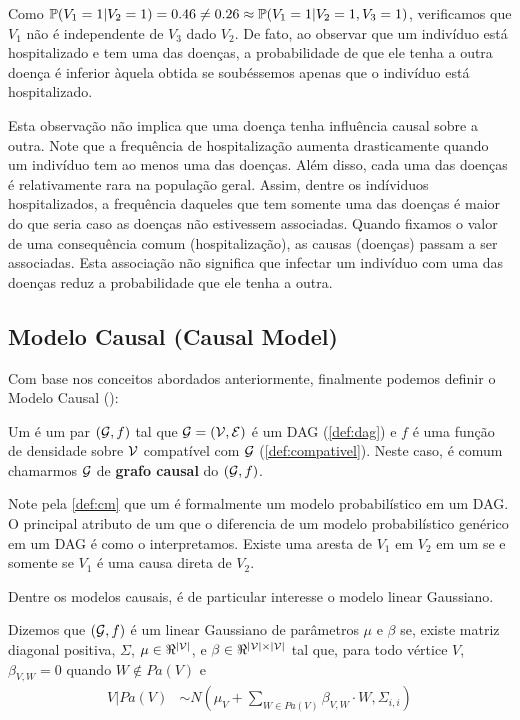 Como $\P(V_1=1|V_2=1) = 0.46 \neq 0.26 \approx \P(V_1=1|V_2=1,V_3=1)$,
verificamos que $V_1$ não é independente de $V_3$ dado $V_2$.
De fato, ao observar que um indivíduo está hospitalizado e
tem uma das doenças, a probabilidade de que ele tenha
a outra doença é inferior àquela obtida se soubéssemos apenas
que o indivíduo está hospitalizado.

Esta observação 
não implica que uma doença tenha influência causal sobre a outra.
Note que a frequência de hospitalização aumenta 
drasticamente quando um indivíduo tem ao menos uma das doenças.
Além disso, cada uma das doenças é relativamente rara na população geral.
Assim, dentre os indíviduos hospitalizados,
a frequência daqueles que tem somente uma das doenças é
maior do que seria caso as doenças não estivessem associadas.
Quando fixamos o valor de uma consequência comum (hospitalização),
as causas (doenças) passam a ser associadas.
Esta associação não significa que
infectar um indivíduo com uma das doenças
reduz a probabilidade que ele tenha a outra.

\subsection{Modelo Causal (Causal Model)}
\label{sec:cm}

Com base nos conceitos abordados anteriormente,
finalmente podemos definir
o Modelo Causal (\CM):

\begin{definition}
 \label{def:cm}
 Um \CM é um par $(\sG,f)$ tal que
 $\sG = (\sV, \sE)$ é um DAG (\cref{def:dag}) e
 $f$ é uma função de densidade sobre $\sV$
 compatível com $\sG$ (\cref{def:compativel}).
 Neste caso, é comum chamarmos $\sG$ de
 \textbf{grafo causal} do \CM $(\sG,f)$.
\end{definition}

Note pela \cref{def:cm} que
um \CM é formalmente um modelo probabilístico em um DAG.
O principal atributo de um \CM que 
o diferencia de um modelo probabilístico genérico em um DAG é
como o interpretamos.
Existe uma aresta de $V_1$ em $V_2$ em um \CM
se e somente se $V_1$ é uma causa direta de $V_2$.

Dentre os modelos causais, 
é de particular interesse
o modelo linear Gaussiano.

\begin{definition}
 \label{def:cm_linear}
 Dizemos que $(\sG,f)$ é um \CM linear Gaussiano 
 de parâmetros $\mu$ e $\beta$ se,
 existe matriz diagonal positiva, $\Sigma$, 
 $\mu \in \Re^{|\sV|}$, e
 $\beta \in \Re^{|\sV| \times |\sV|}$ tal que,
 para todo vértice $V$,
 $\beta_{V,W} = 0$ quando $W \notin Pa(V)$ e
 \begin{align*}
  V|Pa(V) &\sim N\left(\mu_V + \sum_{W \in Pa(V)} \beta_{V,W} \cdot W, \Sigma_{i,i}\right)
 \end{align*}
\end{definition}

